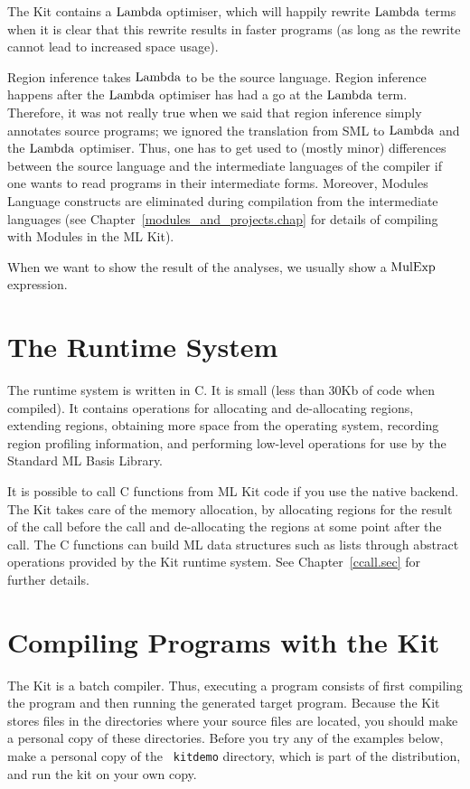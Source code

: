 \documentclass[12pt]{book}
\begin{document}
The Kit contains a
%
$\hbox{\rm Lambda}$ optimiser, which will happily rewrite $\hbox{\rm Lambda}$ terms when it is
clear that this rewrite results in faster programs (as long as the
rewrite cannot lead to increased space usage).

Region inference takes $\hbox{\rm Lambda}$ to be the source language. Region
inference happens after the $\hbox{\rm Lambda}$ optimiser has had a go at the
$\hbox{\rm Lambda}$ term.  Therefore, it was not really true when we said that
region inference simply annotates source programs; we ignored the
translation from SML to $\hbox{\rm Lambda}$ and the $\hbox{\rm Lambda}$ optimiser. Thus, one has
to get used to (mostly minor) differences between the source language
and the intermediate languages of the compiler if one wants to read
programs in their intermediate forms. Moreover, 
% 
Modules Language constructs are eliminated during compilation from the
intermediate languages (see Chapter~\ref{modules_and_projects.chap}
for details of compiling with Modules in the ML Kit).

When we want to show the result of the analyses, we usually show a
$\hbox{\rm MulExp}$ expression.

\section{The Runtime System}
The 
%
runtime system is written in C. It is small (less than 30Kb of code
when compiled).  It contains operations for allocating and
de-allocating regions, extending regions, obtaining more space from
the operating system, recording region profiling information, and
performing low-level operations for use by the Standard ML Basis
Library.

It is possible to call 
%
C functions from ML Kit code if you use the native backend.  The Kit
takes care of the memory allocation, by allocating regions for the
result of the call before the call and de-allocating the regions at
some point after the call.  The C functions can build ML data
structures such as lists through abstract operations provided by the
Kit runtime system. See Chapter~\ref{ccall.sec} for further details.

\section{Compiling Programs with the Kit}
\label{tryit.sec}

The Kit is a 
%
batch compiler. Thus, executing a program consists of first compiling
the program and then running the generated target program. Because the
Kit stores files in the directories where your source files are
located, you should make a personal copy of these directories.  Before
you try any of the examples below, make a personal copy of the {\tt
  kitdemo} directory, which is part of the distribution, and run the
kit on your own copy.
\end{document}
